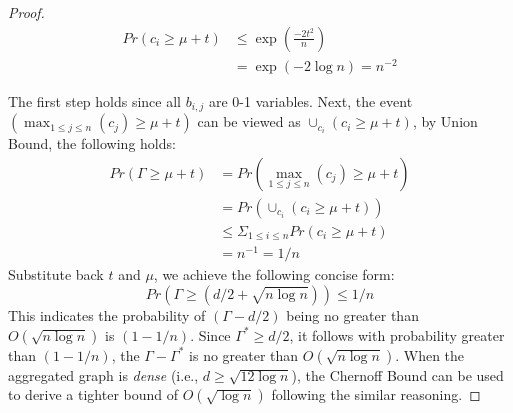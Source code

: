 \begin{proof}
\begin{equation*}
\begin{split}
	Pr(c_i \geq \mu + t) &\leq \exp(\frac{-2t^2}{n}) \\
	 & = \exp(-2\log n) = n^{-2}
\end{split}
\end{equation*}

The first step holds since all $b_{i,j}$ are 0-1 variables. 
Next, the event $(\max_{1 \leq j \leq n}(c_j) \geq \mu + t)$ can be viewed as
$\cup_{c_i} (c_i \geq \mu + t )$, by Union Bound, the following holds:
\begin{equation*}
\begin{split}
	Pr(\Gamma \geq \mu + t) &=Pr(\max_{1\leq j \leq n}(c_j) \geq \mu + t)  \\
		& = Pr(\cup_{c_i} (c_i \geq \mu + t )) \\
		&\leq \Sigma_{1 \leq i \leq n} Pr(c_i \geq \mu + t) \\ 
		&= n^{-1} = 1/n
\end{split}
\end{equation*}
Substitute back $t$ and $\mu$, we achieve the following concise form:
\begin{equation*}
	Pr(\Gamma \geq (d/2 + \sqrt{n\log n})) \leq 1/n
\end{equation*}
This indicates the probability of $(\Gamma-d/2)$ being no greater than $ O(\sqrt{n\log n})$ is $(1-1/n)$. 
Since $\Gamma^* \geq d/2$, it follows with probability greater than $(1-1/n)$, 
the $\Gamma - \Gamma^*$ is no greater than $O(\sqrt{n\log n})$.
When the aggregated graph is \emph{dense} (i.e., $d\geq \sqrt{12 \log n}$),
the Chernoff Bound can be used to derive a tighter bound of 
$O(\sqrt{\log n}) $ following the similar reasoning.
\end{proof}


